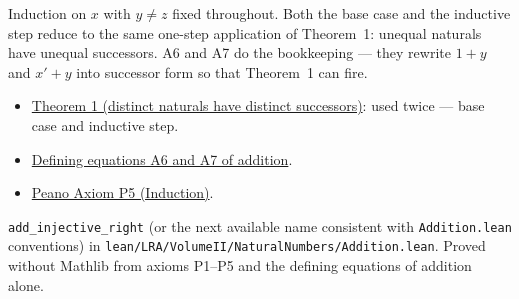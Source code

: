 \begin{remark*}
Induction on $x$ with $y \neq z$ fixed throughout.
Both the base case and the inductive step reduce to the same one-step
application of Theorem~1: unequal naturals have unequal successors.
A6 and A7 do the bookkeeping — they rewrite $1 + y$ and $x' + y$ into
successor form so that Theorem~1 can fire.

\end{remark*}

\begin{dependencies}
\begin{itemize}
  \item \hyperref[thm:landau-thm1-succ-strict]{Theorem 1 (distinct naturals have
    distinct successors)}: used twice — base case and inductive step.
  \item \hyperref[thm:landau-addition-exists-unique]{Defining equations A6 and A7 of addition}.
  \item \hyperref[ax:landau-peano]{Peano Axiom P5 (Induction)}.
\end{itemize}

\end{dependencies}

\begin{remark*}
\texttt{add\_injective\_right} (or the next available name consistent with
\texttt{Addition.lean} conventions) in
\texttt{lean/LRA/VolumeII/NaturalNumbers/Addition.lean}.
Proved without Mathlib from axioms P1--P5 and the defining equations of
addition alone.
\end{remark*}

\clearpage
